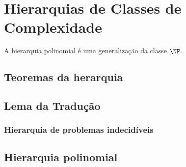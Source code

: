 \chapter{Hierarquias de Classes de Complexidade}

A hierarquia polinomial é uma generalização da classe $\NP$.



\section{Teoremas da herarquia}

\section{Lema da Tradução}
\label{secao_lema_traducao}



\subsection{Hierarquia de problemas indecidíveis}

\section{Hierarquia polinomial}
